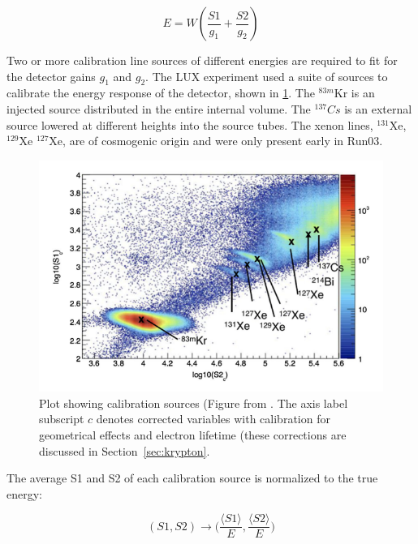 \begin{equation}
E = W (\frac{S1}{g_{1}} + \frac{S2}{g_{2}})
\end{equation}

Two or more calibration line sources of different energies are required to fit for the detector gains $g_{1}$ and $g_{2}$. The \ac{LUX} experiment used a suite of sources to calibrate the energy response of the detector, shown in \ref{fig:calib_sources}. The $^{83m}$Kr is an injected source distributed in the entire internal volume. The $^{137}Cs$ is an external source lowered at different heights into the source tubes. The xenon lines, $^{131}$Xe, $^{129}$Xe $^{127}$Xe, are of cosmogenic origin and were only present early in Run03.

\begin{figure}[htbp]
\begin{center}
\includegraphics[width=\textwidth]{figures/lux/calibration_sources.png}
\caption{Plot showing calibration sources (Figure from \cite{LUX:Run03Comprehensive}. The axis label subscript $c$ denotes corrected variables with calibration for geometrical effects and electron lifetime (these corrections are discussed in Section~\ref{sec:krypton}.}
\label{fig:calib_sources}
\end{center}
\end{figure}

The average S1 and S2 of each calibration source is normalized to the true energy:

\begin{equation}
(S1, S2) \longrightarrow \Big(\frac{\langle S1 \rangle}{E}, \frac{\langle S2 \rangle}{E}\Big)
\end{equation}


